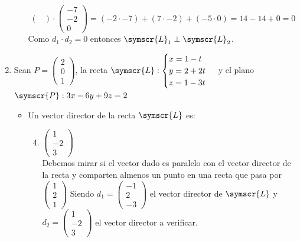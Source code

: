 \documentclass{article}
\def\fancyL{\symscr{L}}
\def\fancyP{\symscr{P}}
\begin{document}
\begin{enumerate}
\begin{enumerate}[label=\listAlph]
\[\begin{pmatrix}
                \end{pmatrix}
                \cdot
                \begin{pmatrix}
                    -7 \\ -2 \\ 0
                \end{pmatrix}
                =
                (-2 \cdot -7) + (7 \cdot -2) + (-5 \cdot 0)
                =
                14 - 14 + 0
                =
                0
            \]
            Como \(d_1 \cdot d_2 = 0\) entonces \(\fancyL_1 \perp \fancyL_2\).
    \end{enumerate}
\item Sean \(P = \left(\begin{smallmatrix}2 \\ 0 \\ 1\end{smallmatrix}\right)\), la recta \(\fancyL: \begin{cases}x = 1 -t \\ y = 2 + 2t \\ z = 1 - 3t\end{cases}\) y el plano \(\fancyP: 3x -6y + 9z = 2\)
        \begin{itemize}
            \item Un vector director de la recta \(\fancyL\) es:
                \begin{enumerate}[label=\listAlph]
                    \setcounter{enumii}{3}
					\item \(\begin{pmatrix}1 \\ -2 \\ 3\end{pmatrix}\) \\
                        Debemos mirar si el vector dado es paralelo con el vector director de la recta y comparten almenos un punto en una recta que pasa por \(\left(\begin{smallmatrix}1 \\ 2 \\ 1\end{smallmatrix}\right)\)
                        Siendo \(d_1 = \begin{pmatrix}-1 \\ 2 \\ -3\end{pmatrix}\) el vector director de \(\fancyL\) y \(d_2 = \begin{pmatrix}1 \\ -2 \\ 3\end{pmatrix}\) el vector director a verificar.

\end{enumerate}
\end{itemize}
\end{enumerate}
\end{document}
